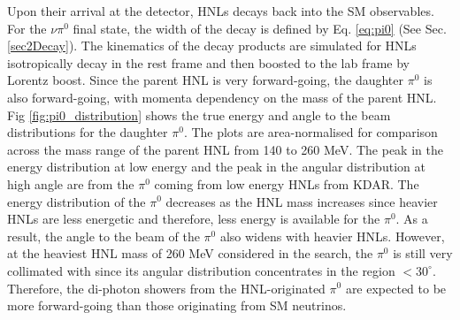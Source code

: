 Upon their arrival at the detector, HNLs decays back into the SM observables.
For the $\nu\pi^{0}$ final state, the width of the decay is defined by Eq. \ref{eq:pi0} (See Sec. \ref{sec2Decay}).
The kinematics of the decay products are simulated for HNLs isotropically decay in the rest frame and then boosted to the lab frame by Lorentz boost.
Since the parent HNL is very forward-going, the daughter $\pi^0$ is also forward-going, with momenta dependency on the mass of the parent HNL. 
Fig \ref{fig:pi0_distribution} shows the true energy and angle to the beam distributions for the daughter $\pi^0$.
The plots are area-normalised for comparison across the mass range of the parent HNL from 140 to 260 MeV. 
The peak in the energy distribution at low energy and the peak in the angular distribution at high angle are from the $\pi^0$ coming from low energy HNLs from KDAR.
The energy distribution of the $\pi^0$ decreases as the HNL mass increases since heavier HNLs are less energetic and therefore, less energy is available for the $\pi^0$.
As a result, the angle to the beam of the $\pi^0$ also widens with heavier HNLs.
However, at the heaviest HNL mass of 260 MeV considered in the search, the $\pi^0$ is still very collimated with since its angular distribution concentrates in the region $< 30^\circ$. 
Therefore, the di-photon showers from the HNL-originated $\pi^0$ are expected to be more forward-going than those originating from SM neutrinos.

